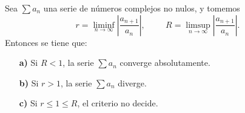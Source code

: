\begin{theorem}\label{crit_cociente}
  Sea $\sum a_n$ una serie de números complejos no nulos, y tomemos
  \begin{equation*}
    r=\liminf_{n\to\infty}\left|\frac{a_{n+1}}{a_n}\right|, \hspace{1cm}R=\limsup_{n\to\infty}\left|\frac{a_{n+1}}{a_n}\right|.
  \end{equation*}
  Entonces se tiene que:
  \begin{itemize}
    \item[\textbf{a)}] Si $R<1$, la serie $\sum a_n$ converge absolutamente.
    \item[\textbf{b)}] Si $r>1$, la serie $\sum a_n$ diverge.
    \item[\textbf{c)}] Si $r\leq 1\leq R$, el criterio no decide.
  \end{itemize}
\end{theorem}
